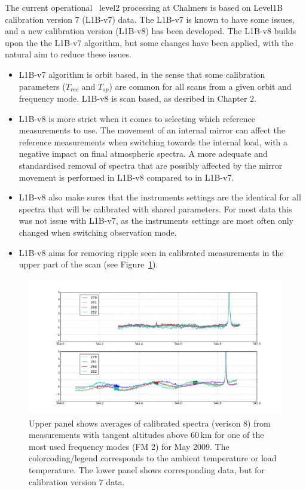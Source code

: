 The current operational \smr\ level2 processing at Chalmers is based on 
Level1B calibration version 7 (L1B-v7) data. 
The L1B-v7 is known to have some issues, and a new calibration version
(L1B-v8) has been developed. The L1B-v8 builds upon the the L1B-v7 algorithm,
but some changes have been applied, with the natural aim to reduce these issues.  

\begin{itemize}

\item L1B-v7 algorithm is orbit based, in the sense that some calibration parameters (\(T_{rec}\)
and \(T_{sp}\)) are common for all scans from a given orbit and frequency mode.
L1B-v8 is scan based, as desribed in Chapter 2.
 
\item L1B-v8 is more strict when it comes to selecting which reference measurements to use.
The movement of an internal mirror can affect the reference measurements when switching
towards the internal load, with a negative impact on final atmospheric
spectra. A more adequate and standardised removal of spectra that are possibly 
affected by the mirror movement is performed in L1B-v8 compared to in L1B-v7. 

\item L1B-v8 also make sures that the instruments settings are the identical
for all spectra that will be calibrated with shared parameters. For most data
this was not issue with L1B-v7, as the instruments settings are most often
only changed when switching observation mode.   


\item L1B-v8 aims for removing ripple seen in calibrated measurements in the
upper part of the scan (see Figure~\ref{fig:ripple}).

\end{itemize}


\begin{figure}
\includegraphics[width=14cm]{ripple_v7and8_FM2_may2009.png}
\caption{Upper panel shows averages of calibrated spectra (verison 8) from measurements
with tangent altitudes above 60\,km for one of the most used frequency modes (FM 2) for May 2009.
The colorcoding/legend corresponds to the ambient temperature or load temperature.
The lower panel shows corresponding data, but for calibration version 7 data.}
\label{fig:ripple}
\end{figure}




